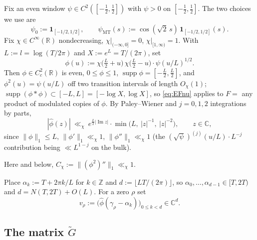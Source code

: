 \documentclass[11pt]{amsart}
\theoremstyle{definition}
\theoremstyle{remark}
\numberwithin{equation}{section}
\DeclareMathOperator{\supp}{supp}
\DeclareMathOperator{\im}{Im}
\newcommand{\RR}{\mathbb{R}}
\newcommand{\CC}{\mathbb{C}}
\newcommand{\ZZ}{\mathbb{Z}}
\newcommand{\wh}{\widehat}
\newcommand{\Gt}{\widetilde{G}}
\newcommand{\one}{\mathbf 1}
\begin{document}
Fix an even window $\psi\in C^2([-\tfrac12,\tfrac12])$ with $\psi>0$ on $[-\tfrac12,\tfrac12]$. The two choices we use are
\begin{equation}\label{eq:psi}
\psi_0:=\one_{[-1/2,1/2]},\qquad
\psi_{\mathrm{MT}}(s):=\cos(\sqrt2\,s)\,\one_{[-1/2,1/2]}(s).
\end{equation}
Fix $\chi\in C^\infty(\RR)$ nondecreasing, $\chi|_{(-\infty,0]}=0$, $\chi|_{[1,\infty)}=1$. With $L:=l=\log(T/2\pi)$ and $X:=e^L=T/(2\pi)$, set
\begin{equation}\label{eq:phidef}
\phi(u):=\chi\bigl(\tfrac L2+u\bigr)\,\chi\bigl(\tfrac L2-u\bigr)\cdot\psi(u/L)^{1/2}.
\end{equation}
Then $\phi\in C_c^2(\RR)$ is even, $0\le\phi\le1$, $\supp\phi=[-\tfrac L2,\tfrac L2]$, and $\phi^2(u)=\psi(u/L)$ off two transition intervals of length $O_\chi(1)$; $\supp(\phi*\phi)\subset[-L,L]=[-\log X,\log X]$, so \eqref{eq:EFnu} applies to $F=$ any product of modulated copies of $\phi$. By Paley--Wiener and $j=0,1,2$ integrations by parts,
\begin{equation}\label{eq:PW}
|\wh\phi(z)|\ \ll_\chi\ e^{\frac L2|\im z|}\cdot\min\bigl(L,\ |z|^{-1},\ |z|^{-2}\bigr),\qquad z\in\CC,
\end{equation}
since $\|\phi\|_1\le L$, $\|\phi'\|_1\ll_\chi1$, $\|\phi''\|_1\ll_\chi1$ (the $(\sqrt\psi)^{(j)}(u/L)\cdot L^{-j}$ contribution being $\ll L^{1-j}$ on the bulk).

Here and below, $C_\chi:=\|(\phi^2)''\|_1\ll_\chi1$.

Place $\alpha_k:=T+2\pi k/L$ for $k\in\ZZ$ and $d:=\lfloor LT/(2\pi)\rfloor$, so $\alpha_0,\dots,\alpha_{d-1}\in[T,2T)$ and $d=N(T,2T)+O(L)$. For a zero $\rho$ set
\begin{equation}\label{eq:vrho}
v_\rho:=\bigl(\wh\phi(\gamma_\rho-\alpha_k)\bigr)_{0\le k<d}\in\CC^d.
\end{equation}

\subsection{The matrix $\Gt$}\label{subsec:G}
\end{document}
